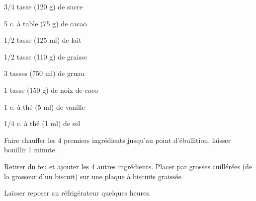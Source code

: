 %
%   
%   
%   
%




\totaltime{}


\begin{ingredients}
    \item 3/4 tasse (120 g) de sucre
    \item 5 c. à table (75 g) de cacao
    \item 1/2 tasse (125 ml) de lait
    \item 1/2 tasse (110 g) de graisse
    \item 3 tasses (750 ml) de gruau
    \item 1 tasse (150 g) de noix de coco
    \item 1 c. à thé (5 ml) de vanille
    \item 1/4 c. à thé (1 ml) de sel
\end{ingredients}

\begin{steps}
    \item Faire chauffer les 4 premiers ingrédients jusqu'au point d'ébullition, laisser bouillir 1 minute.
    \item Retirer du feu et ajouter les 4 autres ingrédients. Placer par grosses cuillérées (de la grosseur d'un biscuit) sur une plaque à biscuits graissée.
    \item Laisser reposer au réfrigérateur quelques heures.
\end{steps}
